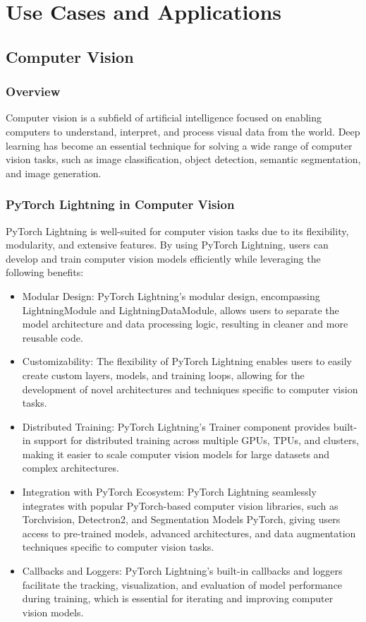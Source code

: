 \documentclass[12pt]{article}
\begin{document}
\section{Use Cases and Applications}

\subsection{Computer Vision}

\subsubsection{Overview}

Computer vision is a subfield of artificial intelligence focused on enabling computers to understand, interpret, and process visual data from the world. Deep learning has become an essential technique for solving a wide range of computer vision tasks, such as image classification, object detection, semantic segmentation, and image generation.

\subsubsection{PyTorch Lightning in Computer Vision}

PyTorch Lightning is well-suited for computer vision tasks due to its flexibility, modularity, and extensive features. By using PyTorch Lightning, users can develop and train computer vision models efficiently while leveraging the following benefits:

\begin{itemize}
    \item Modular Design: PyTorch Lightning's modular design, encompassing LightningModule and LightningDataModule, allows users to separate the model architecture and data processing logic, resulting in cleaner and more reusable code.
    \item Customizability: The flexibility of PyTorch Lightning enables users to easily create custom layers, models, and training loops, allowing for the development of novel architectures and techniques specific to computer vision tasks.
    \item Distributed Training: PyTorch Lightning's Trainer component provides built-in support for distributed training across multiple GPUs, TPUs, and clusters, making it easier to scale computer vision models for large datasets and complex architectures.
    \item Integration with PyTorch Ecosystem: PyTorch Lightning seamlessly integrates with popular PyTorch-based computer vision libraries, such as Torchvision, Detectron2, and Segmentation Models PyTorch, giving users access to pre-trained models, advanced architectures, and data augmentation techniques specific to computer vision tasks.
    \item Callbacks and Loggers: PyTorch Lightning's built-in callbacks and loggers facilitate the tracking, visualization, and evaluation of model performance during training, which is essential for iterating and improving computer vision models.
\end{itemize}
\end{document}
